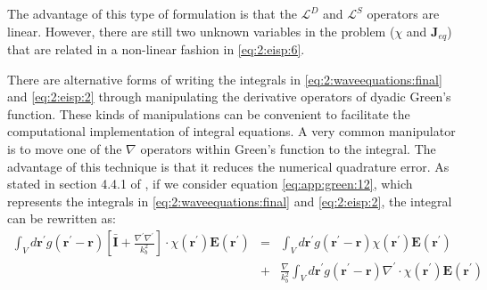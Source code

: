 			The advantage of this type of formulation is that the $\mathcal{L}^D$ and $\mathcal{L}^S$ operators are linear. However, there are still two unknown variables in the problem ($\chi$ and $\mathbf{J}_{eq}$) that are related in a non-linear fashion in \eqref{eq:2:eisp:6}.
	
			There are alternative forms of writing the integrals in \eqref{eq:2:waveequations:final} and \eqref{eq:2:eisp:2} through manipulating the derivative operators of dyadic Green's function. These kinds of manipulations can be convenient to facilitate the computational implementation of integral equations. A very common manipulator is to move one of the $\nabla$ operators within Green's function to the integral. The advantage of this technique is that it reduces the numerical quadrature error. As stated in section 4.4.1 of \cite{chew2009}, if we consider equation \eqref{eq:app:green:12}, which represents the integrals in \eqref{eq:2:waveequations:final} and \eqref{eq:2:eisp:2}, the integral can be rewritten as:
			\begin{eqnarray}
				\int_Vd\mathbf{r^\prime}g(\mathbf{r^\prime}-\mathbf{r})\left[\mathbf{\bar{I}}+\frac{\nabla^\prime\nabla^\prime}{k^2_b}\right]\cdot\chi(\mathbf{r^\prime})\mathbf{E}(\mathbf{r^\prime}) &=& \int_Vd\mathbf{r^\prime}g(\mathbf{r^\prime}-\mathbf{r})\chi(\mathbf{r^\prime})\mathbf{E}(\mathbf{r^\prime})\nonumber\\
				&+& \frac{\nabla}{k_b^2}\int_Vd\mathbf{r^\prime}g(\mathbf{r^\prime}-\mathbf{r})\nabla^\prime\cdot\chi(\mathbf{r^\prime})\mathbf{E}(\mathbf{r^\prime}) \label{eq:2:eisp:7}
			\end{eqnarray}
		
